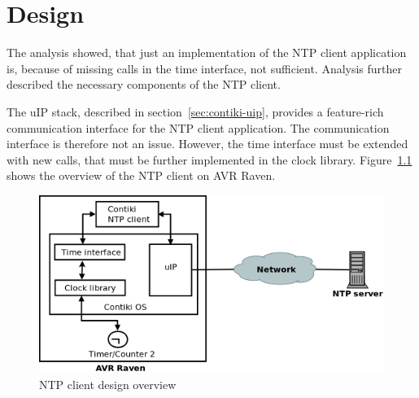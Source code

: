 
\chapter{Design}
The analysis showed, that just an implementation of the
NTP client application is, because of missing calls in the time interface, not sufficient.
Analysis further described the necessary components of the NTP client.

The uIP stack, described in section~\ref{sec:contiki-uip}, provides a feature-rich
communication interface for the NTP client application.
The communication interface is therefore not an issue.
However, the time interface must be extended with new calls,
that must be further implemented in the clock library.
Figure~\ref{fig:design-overview} shows the overview of the NTP client on AVR Raven.

\begin{figure}[H]
  \centering
  \includegraphics[width=13cm,keepaspectratio]{fig/design.png}
  \caption{NTP client design overview}
  \label{fig:design-overview}
\end{figure}






